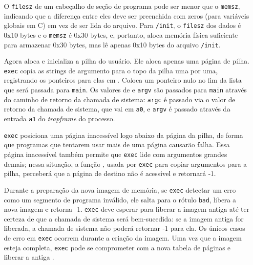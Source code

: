 O \lstinline{filesz} de um cabeçalho de seção de programa pode ser menor que o \lstinline{memsz},  
indicando que a diferença entre eles deve ser preenchida com zeros (para variáveis globais em C) em vez de ser lida do arquivo.  
Para \lstinline{/init}, o \lstinline{filesz} dos dados é 0x10 bytes e o \lstinline{memsz} é 0x30 bytes,  
e, portanto,  aloca memória física suficiente para armazenar 0x30 bytes, mas lê apenas 0x10 bytes do arquivo \lstinline{/init}.

Agora  aloca e inicializa a pilha do usuário.  
Ele aloca apenas uma página de pilha.  
\lstinline{exec} copia as strings de argumento para o topo da pilha uma por uma, registrando os ponteiros para elas em .  
Coloca um ponteiro nulo no fim da lista  que será passada para \lstinline{main}.  
Os valores de  e \lstinline{argv} são passados para \lstinline{main} através do caminho de retorno da chamada de sistema: \lstinline{argc} é passado via o valor de retorno da 
chamada de sistema, que vai em {\tt a0}, e \lstinline{argv} é passado através da entrada {\tt a1} do \textit{trapframe} do processo.

\lstinline{exec} posiciona uma página inacessível logo abaixo da página da pilha,  
de forma que programas que tentarem usar mais de uma página causarão falha.  
Essa página inacessível também permite que \lstinline{exec} lide com argumentos grandes demais;  
nessa situação, a função  ,  
usada por \lstinline{exec} para copiar argumentos para a pilha, perceberá que a página de destino não é acessível e retornará -1.

Durante a preparação da nova imagem de memória, se \lstinline{exec} detectar um erro como um segmento de programa inválido, ele salta para o rótulo \lstinline{bad},  
libera a nova imagem e retorna -1.  
\lstinline{exec} deve esperar para liberar a imagem antiga até ter certeza de que a chamada de sistema será bem-sucedida:  
se a imagem antiga for liberada, a chamada de sistema não poderá retornar -1 para ela.  
Os únicos casos de erro em \lstinline{exec} ocorrem durante a criação da imagem.  
Uma vez que a imagem esteja completa, \lstinline{exec} pode se comprometer com a nova tabela de páginas   
e liberar a antiga .

